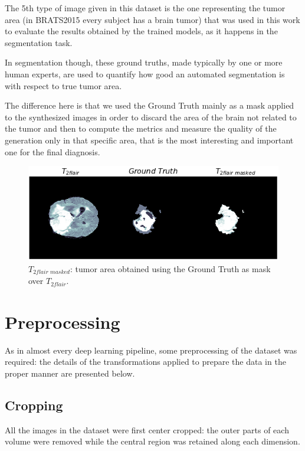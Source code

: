 \vspace{2mm} %
The 5th type of image given in this dataset is the one representing the tumor area (in BRATS2015 every subject has a brain tumor) that was used in this work to evaluate the results obtained by the trained models, as it happens in the segmentation task.

In segmentation though, these ground truths, made typically by one or more human experts, are used to quantify how good an automated segmentation is with respect to true tumor area. 

The difference here is that we used the Ground Truth mainly as a mask applied to the synthesized images in order to discard the area of the brain not related to the tumor and then to compute the metrics and measure the quality of the generation only in that specific area, that is the most interesting and important one for the final diagnosis.

\begin{figure}[H]
\centering
\includegraphics[height=0.19\textheight]{images/tumor.pdf}
\caption[GT used as mask to segment the $T_{2\textit{flair}}$ tumor area]{$T_{2\textit{flair\ masked}}$: tumor area obtained using the Ground Truth as mask over $T_{2\textit{flair}}$.}
\label{fig:tumor}
\end{figure}

\section{Preprocessing}
\label{sec:preprocessing}
As in almost every deep learning pipeline, some preprocessing of the dataset was required: the details of the transformations applied to prepare the data in the proper manner are presented below.

\subsection{Cropping}
\label{sec:cropping}
All the images in the dataset were first center cropped: the outer parts of each volume were removed while the central region was retained along each dimension.

